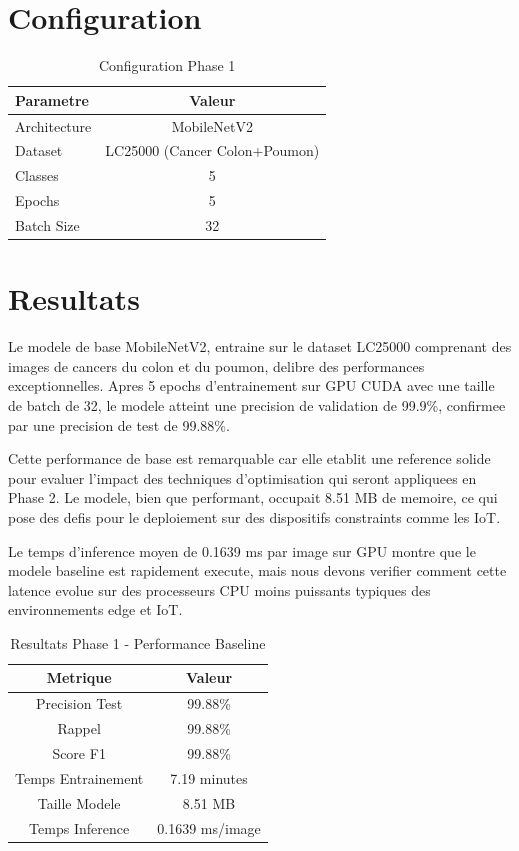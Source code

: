 \documentclass[12pt,a4paper]{report}
\begin{document}
\section{Configuration}

\begin{table}[H]
\centering
\begin{tabular}{|l|c|}
\hline
\textbf{Parametre} & \textbf{Valeur} \\
\hline
Architecture & MobileNetV2 \\
Dataset & LC25000 (Cancer Colon+Poumon) \\
Classes & 5 \\
Epochs & 5 \\
Batch Size & 32 \\
\hline
\end{tabular}
\caption{Configuration Phase 1}
\end{table}

\section{Resultats}

Le modele de base MobileNetV2, entraine sur le dataset LC25000 comprenant des images de cancers du colon et du poumon, delibre des performances exceptionnelles. Apres 5 epochs d'entrainement sur GPU CUDA avec une taille de batch de 32, le modele atteint une precision de validation de 99.9\%, confirmee par une precision de test de 99.88\%.

Cette performance de base est remarquable car elle etablit une reference solide pour evaluer l'impact des techniques d'optimisation qui seront appliquees en Phase 2. Le modele, bien que performant, occupait 8.51 MB de memoire, ce qui pose des defis pour le deploiement sur des dispositifs constraints comme les IoT.

Le temps d'inference moyen de 0.1639 ms par image sur GPU montre que le modele baseline est rapidement execute, mais nous devons verifier comment cette latence evolue sur des processeurs CPU moins puissants typiques des environnements edge et IoT.

\begin{table}[H]
\centering
\begin{tabular}{|c|c|}
\hline
\textbf{Metrique} & \textbf{Valeur} \\
\hline
Precision Test & 99.88\% \\
Rappel & 99.88\% \\
Score F1 & 99.88\% \\
Temps Entrainement & 7.19 minutes \\
Taille Modele & 8.51 MB \\
Temps Inference & 0.1639 ms/image \\
\hline
\end{tabular}
\caption{Resultats Phase 1 - Performance Baseline}
\end{table}
\end{document}
